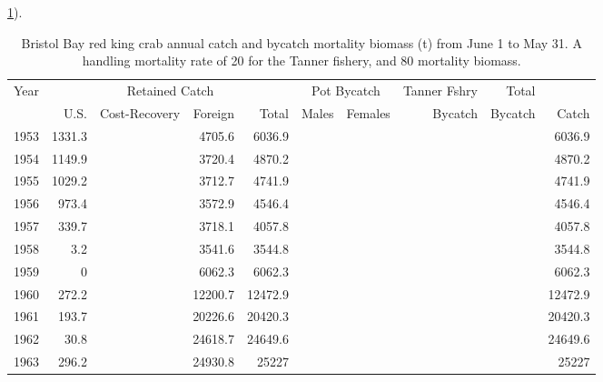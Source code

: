 \documentclass[]{article}
\begin{document}
\ref{tab:bbrkc_fishery}).

\begin{table}[ht]
\centering
\caption{ Bristol Bay red king crab annual catch and bycatch mortality biomass (t) from
June 1 to May 31. A handling mortality rate of 20%
for the Tanner fishery, and 80%
mortality biomass. }
\label{tab:bbrkc_fishery}
\footnotesize
\begin{tabular}{lrrrrrrrrr}
\hline
Year & \multicolumn{4}{c}{Retained Catch}                 & \multicolumn{2}{c}{Pot Bycatch}Trawl         & Tanner Fshry  & Total      \\
     & U.S.           & Cost-Recovery & Foreign & Total   & Males       & Females & Bycatch       & Bycatch        & Catch      \\
\hline
1953 & 1331.3         &               & 4705.6  & 6036.9  &             &         &               &                & 6036.9     \\
1954 & 1149.9         &               & 3720.4  & 4870.2  &             &         &               &                & 4870.2      \\
1955 & 1029.2         &               & 3712.7  & 4741.9  &             &         &               &                & 4741.9      \\
1956 & 973.4          &               & 3572.9  & 4546.4  &             &         &               &                & 4546.4      \\
1957 & 339.7          &               & 3718.1  & 4057.8  &             &         &               &                & 4057.8      \\
1958 & 3.2            &               & 3541.6  & 3544.8  &             &         &               &                & 3544.8      \\
1959 & 0              &               & 6062.3  & 6062.3  &             &         &               &                & 6062.3      \\
1960 & 272.2          &               & 12200.7 & 12472.9 &             &         &               &                & 12472.9     \\
1961 & 193.7          &               & 20226.6 & 20420.3 &             &         &               &                & 20420.3     \\
1962 & 30.8           &               & 24618.7 & 24649.6 &             &         &               &                & 24649.6     \\
1963 & 296.2          &               & 24930.8 & 25227   &             &         &               &                & 25227       \\

\end{tabular}
\end{table}
\end{document}
